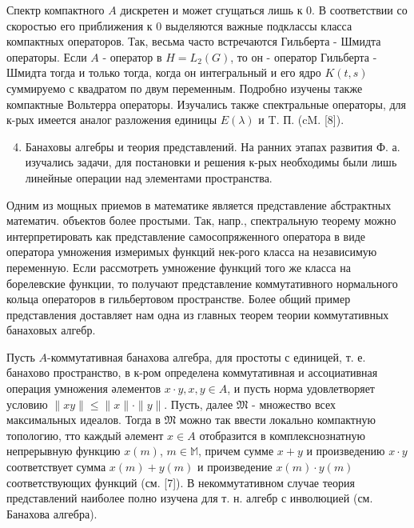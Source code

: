\documentclass[10pt]{article}
\begin{document}
Спектр компактного $A$ дискретен и может сгущаться лишь к 0. В соответствии со скоростью его приближения к 0 выделяются важные подклассы класса компактных операторов. Так, весьма часто встречаются Гильберта - Шмидта операторы. Если $A$ - оператор в $H=L_{2}(G)$, то он - оператор Гильберта - Шмидта тогда и только тогда, когда он интегральный и его ядро $K(t, s)$ суммируемо с квадратом по двум переменным. Подробно изучены также компактные Вольтерра операторы. Изучались также спектральные операторы, для к-рых имеется аналог разложения единицы $E(\lambda)$ и T. П. (cM. [8]).



\begin{enumerate}

  \setcounter{enumi}{3}

  \item Банаховы алгебры и теория представлений. На ранних этапах развития Ф. а. изучались задачи, для постановки и решения к-рых необходимы были лишь линейные операции над элементами пространства.

\end{enumerate}



Одним из мощных приемов в математике является представление абстрактных математич. объектов более простыми. Так, напр., спектральную теорему можно интерпретировать как представление самосопряженного оператора в виде оператора умножения измеримых функций нек-рого класса на независимую переменную. Если рассмотреть умножение функций того же класса на борелевские функции, то получают представление коммутативного нормального кольца операторов в гильбертовом пространстве. Более общий пример представления доставляет нам одна из главных теорем теории коммутативных банаховых алгебр.



Пусть $A$-коммутативная банахова алгебра, для простоты с единицей, т. е. банахово пространство, в к-ром определена коммутативная и ассоциативная операция умножения әлементов $x \cdot y, x, y \in A$, и пусть норма удовлетворяет условию $\|x y\| \leqslant\|x\| \cdot\|y\|$. Пусть, далее $\mathfrak{M}$ - множество всех максимальных идеалов. Тогда в $\mathfrak{M}$ можно так ввести локально компактную топологию, тто каждый әлемент $x \in A$ отобразится в комплекснознатную непрерывную функцию $x(m)$, $m \in \mathbb{M}$, причем сумме $x+y$ и произведению $x \cdot y$ соответствует сумма $x(m)+y(m)$ и произведение $x(m) \cdot y(m)$ соответствующих функций (см. [7]). В некоммутативном случае теория представлений наиболее полно изучена для т. н. алгебр с инволюцией (см. Банахова алгебра).
\end{document}
